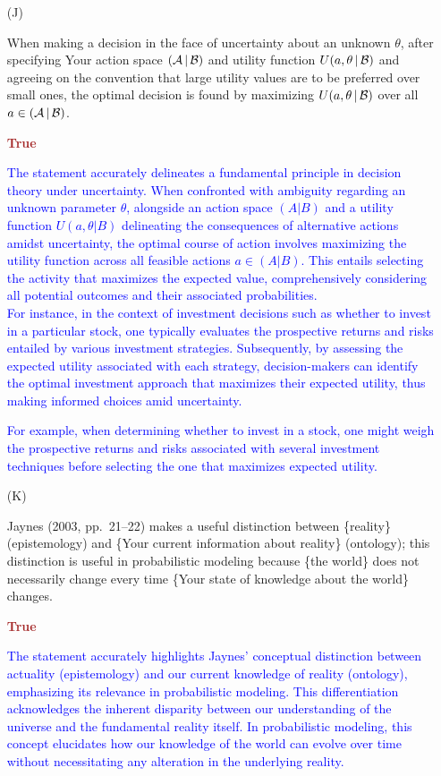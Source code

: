 \documentclass[12pt]{article}
\newcommand{\given}{\, | \,}
\begin{document}
\begin{itemize}
\item[(J)]

When making a decision in the face of uncertainty about an unknown $\theta$, after specifying Your action space $( { \cal A } \given { \cal B } )$ and utility function $U ( a, \theta \given { \cal B } )$ and agreeing on the convention that large utility values are to be preferred over small ones, the optimal decision is found by maximizing $U ( a, \theta \given { \cal B } )$ over all $a \in ( { \cal A } \given { \cal B } )$.

\textcolor{brown}{\textbf{True}}

\textcolor{blue}{The statement accurately delineates a fundamental principle in decision theory under uncertainty. When confronted with ambiguity regarding an unknown parameter \(\theta\), alongside an action space \((A|B)\) and a utility function \(U(a, \theta|B)\) delineating the consequences of alternative actions amidst uncertainty, the optimal course of action involves maximizing the utility function across all feasible actions \(a \in (A|B)\). This entails selecting the activity that maximizes the expected value, comprehensively considering all potential outcomes and their associated probabilities. \\
For instance, in the context of investment decisions such as whether to invest in a particular stock, one typically evaluates the prospective returns and risks entailed by various investment strategies. Subsequently, by assessing the expected utility associated with each strategy, decision-makers can identify the optimal investment approach that maximizes their expected utility, thus making informed choices amid uncertainty.}

\textcolor{blue}{For example, when determining whether to invest in a stock, one might weigh the prospective returns and risks associated with several investment techniques before selecting the one that maximizes expected utility.}

\item[(K)]

Jaynes (2003, pp.~21--22) makes a useful distinction between
\{reality\} (epistemology) and \{Your current information about reality\}
(ontology); this distinction is useful in probabilistic modeling because
\{the world\} does not necessarily change every time \{Your state of
knowledge about the world\} changes.

\textcolor{brown}{\textbf{True}}

\textcolor{blue}{The statement accurately highlights Jaynes' conceptual distinction between actuality (epistemology) and our current knowledge of reality (ontology), emphasizing its relevance in probabilistic modeling. This differentiation acknowledges the inherent disparity between our understanding of the universe and the fundamental reality itself. In probabilistic modeling, this concept elucidates how our knowledge of the world can evolve over time without necessitating any alteration in the underlying reality.}


\end{itemize}
\end{document}
